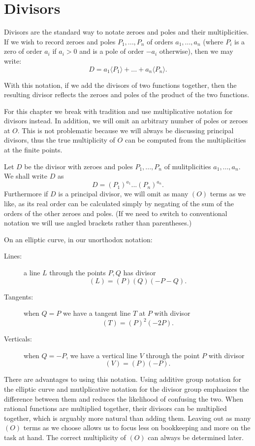 \section {Divisors}

Divisors are the standard way
to notate zeroes and poles and their multiplicities.
If we wish to record zeroes and poles $P_1,...,P_n$
of orders $a_1,...,a_n$ (where $P_i$ is a zero of order
$a_i$ if $a_i > 0$ and is a pole of order $-a_i$ otherwise), then
we may write:
\[ D = a_1\langle P_1\rangle + ... + a_n \langle P_n\rangle .\]

With this notation, if we add the divisors of two functions together,
then the resulting divisor reflects the zeroes and poles of the product
of the two functions.

For this chapter we break with tradition and use multiplicative
notation for divisors instead. In addition, we will omit an arbitrary
number of poles or zeroes at $O$. This is not problematic because we
will always be discussing principal divisors, thus the true multiplicity
of $O$ can be computed from the multiplicities at the finite points.

Let $D$ be the divisor with zeroes and poles $P_1,...,P_n$
of mulitplicities $a_1,...,a_n$.
We shall write $D$ as
\[ D = (P_1)^{a_1} ... (P_n)^{a_n} . \]
Furthermore if $D$ is a principal divisor, we will
omit as many $(O)$ terms as we like, as its real order
can be calculated simply by negating
of the sum of the orders of the other zeroes and poles.
(If we need to switch to conventional notation we will use angled brackets
rather than parentheses.)

On an elliptic curve, in our unorthodox notation:
\begin{description}
\item[Lines:]
a line $L$ through the points $P, Q$ has divisor
\[ (L) = (P)(Q)(-P-Q) . \]
\item[Tangents:]
when $Q = P$ we have a tangent line $T$ at $P$ with divisor
\[ (T) = (P)^2 (-2P) . \]
\item[Verticals:]
when $Q = -P$, we have a vertical line $V$ through the point $P$
with divisor
\[ (V) = (P)(-P) . \]
\end{description}

There are advantages to using this notation. Using additive group
notation for the elliptic curve and mutlplicative notation for the divisor
group emphasizes the difference between them and reduces the likelihood of
confusing the two. When rational functions are multiplied together,
their divisors can be multiplied together, which is arguably
more natural than adding them.
Leaving out as many $(O)$ terms as we choose allows us to focus less on
bookkeeping and more on the task at hand.
The correct multiplicity of $(O)$ can always be determined later.

